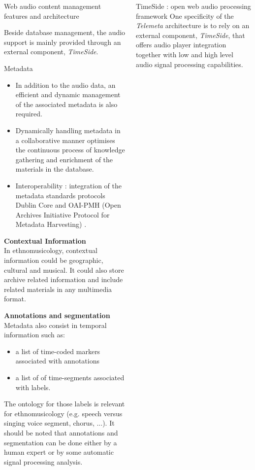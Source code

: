 \documentclass[final, hyperref, table]{beamer}
\begin{document}
\begin{frame}[containsverbatim]{}
\begin{columns}[t]
\begin{column}[T]{.49\linewidth}
\begin{block}{Web audio content management features and architecture}
\begin{itemize}
\end{itemize}
Beside database management, the audio support is mainly provided through an external component, \emph{TimeSide}.

\end{block}
\begin{block}{Metadata}
  \begin{itemize}
  \item In addition to the audio data, an efficient and \alert{dynamic
    management} of the associated metadata is also required.
  \item Dynamically handling metadata in a \alert{collaborative} manner optimises
    the continuous process of knowledge gathering and enrichment of
    the materials in the database.
  \item Interoperability : integration of the metadata standards protocols \alert{Dublin Core}
    and \alert{OAI-PMH} (Open Archives Initiative Protocol for Metadata
    Harvesting) \cite{DublinCore,OAI-PMH}.
  \end{itemize}

\textbf{Contextual Information}\\
In ethnomusicology, contextual information could be geographic, cultural and musical. It could also store archive related information and include related materials in any multimedia format. 

\textbf{Annotations and segmentation}\\
Metadata also consist in temporal information such as:
\begin{itemize}
\item a list of \alert{time-coded markers} associated with annotations
\item a list of of \alert{time-segments} associated with labels.
\end{itemize}
The ontology for those labels is relevant for ethnomusicology (e.g. speech versus singing voice segment, chorus, ...).
It should be noted that annotations and segmentation can be done either by a human expert or by some automatic signal processing analysis.

\end{block}
    \end{column}
   
\begin{column}[T]{.49\linewidth}
  \begin{block}{TimeSide : open web audio processing framework}
One specificity of the \emph{Telemeta} architecture is to rely on an external component, \emph{TimeSide}, that offers audio player integration together with low and high level audio signal processing capabilities.


\end{block}
\end{column}
\end{columns}
\end{frame}
\end{document}
